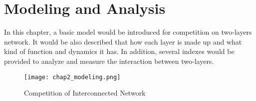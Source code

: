 
\chapter{Modeling and Analysis}
\label{chap2}
In this chapter, a basic model would be introduced for competition on two-layers network. It would be also described that how each layer is made up and what kind of function and dynamics it has. In addition, several indexes would be provided to analyze and measure the interaction between two-layers.
\begin{figure}[!htb]
	\centering
	\texttt{[image: chap2\_modeling.png]}
	\caption{Competition of Interconnected Network}
	\label{chap2_modeling}
\end{figure}
 
